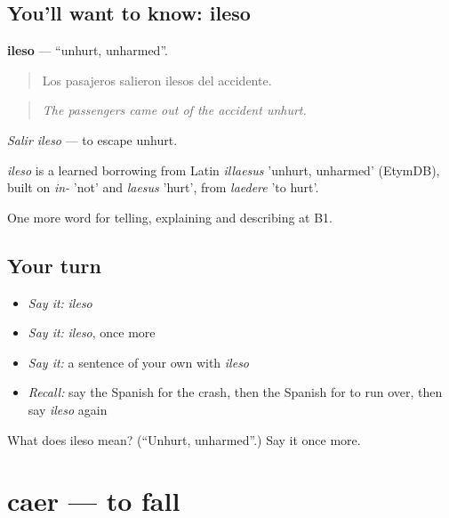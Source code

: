 \subsection*{You'll want to know: ileso}
\textbf{ileso} — \textquotedblleft{}unhurt, unharmed\textquotedblright{}.

\begin{quote}
Los pasajeros salieron ilesos del accidente.
\end{quote}

\begin{quote}
\emph{The passengers came out of the accident unhurt.}
\end{quote}

\emph{Salir ileso} — to escape unhurt.

\begin{cousinweb}
\emph{ileso} is a learned borrowing from Latin \emph{illaesus} 'unhurt, unharmed' (EtymDB), built on \emph{in-} 'not' and \emph{laesus} 'hurt', from \emph{laedere} 'to hurt'.
\end{cousinweb}

\begin{grammarlens}[title={What you've built}]
One more word for telling, explaining and describing at B1.
\end{grammarlens}

\subsection*{Your turn}
\begin{itemize}
\raggedright
  \item \emph{Say it:} \emph{ileso}
  \item \emph{Say it:} \emph{ileso}, once more
  \item \emph{Say it:} a sentence of your own with \emph{ileso}
  \item \emph{Recall:} say the Spanish for the crash, then the Spanish for to run over, then say \emph{ileso} again
\end{itemize}

\begin{tcolorbox}[breakable,colback=teal!4,colframe=teal!35!black,title={Before you move on}]
What does ileso mean? (\textquotedblleft{}Unhurt, unharmed\textquotedblright{}.) Say it once more.
\end{tcolorbox}
\section[caer]{caer — to fall}

